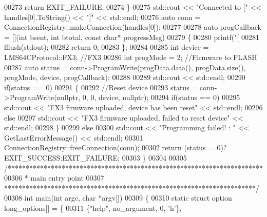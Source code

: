 \begin{DoxyCode}
{{00273         \textcolor{keywordflow}{return} EXIT\_FAILURE;
00274     \}
00275     std::cout << \textcolor{stringliteral}{"Connected to ["} << handles[0].ToString() << \textcolor{stringliteral}{"]"} << std::endl;
00276     \textcolor{keyword}{auto} conn = ConnectionRegistry::makeConnection(handles[0]);
00277 
00278     \textcolor{keyword}{auto} progCallback = [](\textcolor{keywordtype}{int} bsent, \textcolor{keywordtype}{int} btotal, \textcolor{keyword}{const} \textcolor{keywordtype}{char}* progressMsg)
00279     \{
00280         printf(\textcolor{stringliteral}{"[%
00281         fflush(stdout);
00282         \textcolor{keywordflow}{return} 0;
00283     \};
00284 
00285     \textcolor{keywordtype}{int} device = LMS64CProtocol::FX3; \textcolor{comment}{//FX3}
00286     \textcolor{keywordtype}{int} progMode = 2; \textcolor{comment}{//Firmware to FLASH}
00287     \textcolor{keyword}{auto} status = conn->ProgramWrite(progData.data(), progData.size(), progMode, 
      device, progCallback);
00288 
00289     std::cout << std::endl;
00290     \textcolor{keywordflow}{if}(status == 0)
00291     \{
00292         \textcolor{comment}{//Reset device}
00293         status = conn->ProgramWrite(\textcolor{keyword}{nullptr}, 0, 0, device, \textcolor{keyword}{nullptr});
00294         \textcolor{keywordflow}{if}(status == 0)
00295             std::cout << \textcolor{stringliteral}{"FX3 firmware uploaded, device has been reset"} << std::endl;
00296         \textcolor{keywordflow}{else}
00297             std::cout << \textcolor{stringliteral}{"FX3 firmware uploaded, failed to reset device"} << std::endl;
00298     \}
00299     \textcolor{keywordflow}{else}
00300         std::cout << \textcolor{stringliteral}{"Programming failed! : "} << GetLastErrorMessage() << std::endl;
00301     ConnectionRegistry::freeConnection(conn);
00302     \textcolor{keywordflow}{return} (status==0)?EXIT\_SUCCESS:EXIT\_FAILURE;
00303 \}
00304 
00305 \textcolor{comment}{/***********************************************************************}
00306 \textcolor{comment}{ * main entry point}
00307 \textcolor{comment}{ **********************************************************************/}
00308 \textcolor{keywordtype}{int} main(\textcolor{keywordtype}{int} argc, \textcolor{keywordtype}{char} *argv[])
00309 \{
00310     \textcolor{keyword}{static} \textcolor{keyword}{struct }option long\_options[] = \{
00311         \{\textcolor{stringliteral}{"help"}, no\_argument, 0, \textcolor{charliteral}{'h'}\},
}}}
\end{DoxyCode}
